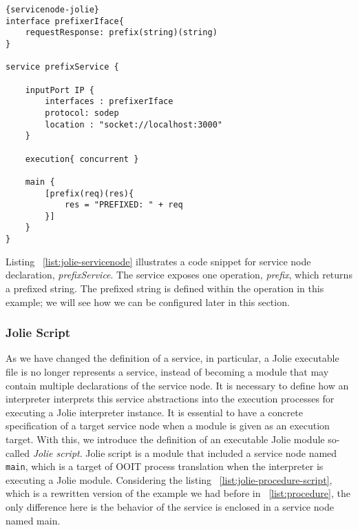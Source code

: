 \begin{listing}[h]

    \lstset{language=Jolie,
        style=codeStyle,
        numbers=left,
        firstnumber=1
    }
    \begin{lstlisting}[frame=tlrb, caption= {Jolie Service Node Example}, label={list:jolie-servicenode} ]{servicenode-jolie}
interface prefixerIface{
    requestResponse: prefix(string)(string)
}

service prefixService {
    
    inputPort IP {
        interfaces : prefixerIface
        protocol: sodep
        location : "socket://localhost:3000"
    }

    execution{ concurrent }

    main {
        [prefix(req)(res){
            res = "PREFIXED: " + req
        }]
    }
}
    \end{lstlisting}
\end{listing}

Listing ~\ref{list:jolie-servicenode} illustrates a code snippet for service node declaration, \textit{prefixService}. The service exposes one operation, \textit{prefix}, which returns a prefixed string. The prefixed string is defined within the operation in this example; we will see how we can be configured later in this section.

\FloatBarrier

\subsubsection*{Jolie Script}

As we have changed the definition of a service, in particular, a Jolie executable file is no longer represents a service, instead of becoming a module that may contain multiple declarations of the service node. It is necessary to define how an interpreter interprets this service abstractions into the execution processes for executing a Jolie interpreter instance.
It is essential to have a concrete specification of a target service node when a module is given as an execution target.
With this, we introduce the definition of an executable Jolie module so-called \textit{Jolie script}.
Jolie script is a module that included a service node named \texttt{main}, which is a target of OOIT process translation when the interpreter is executing a Jolie module. Considering the listing ~\ref{list:jolie-procedure-script}, which is a rewritten version of the example we had before in ~\ref{list:procedure}, the only difference here is the behavior of the service is enclosed in a service node named main. 


